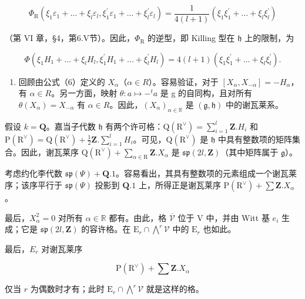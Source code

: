 \[
\varPhi_ {\mathrm{R}} (\xi_ {1} \varepsilon_ {1} + \dots + \xi_ {l} \varepsilon_ {l}, \xi_ {1} ^ {\prime} \varepsilon_ {1} + \dots + \xi_ {l} ^ {\prime} \varepsilon_ {l}) = \frac {1}{4 (l + 1)} (\xi_ {1} \xi_ {1} ^ {\prime} + \dots + \xi_ {l} \xi_ {l} ^ {\prime})
\]

（第 VI 章，§4，第6.V节）。因此，\(\varPhi_{\mathrm{R}}\) 的逆型，即 Killing 型在 \(\mathfrak{h}\) 上的限制，为

\[
\Phi (\xi_ {1} H _ {1} + \dots + \xi_ {l} H _ {l}, \xi_ {1} ^ {\prime} H _ {1} + \dots + \xi_ {l} ^ {\prime} H _ {l}) = 4 (l + 1) (\xi_ {1} \xi_ {1} ^ {\prime} + \dots + \xi_ {l} \xi_ {l} ^ {\prime}).
\]

\begin{enumerate}
\def\labelenumi{(\Roman{enumi})}
\setcounter{enumi}{8}
\tightlist
\item
回顾由公式（6）定义的 \(X_{\alpha}\)（\(\alpha \in R\)）。容易验证，对于 \([X_{\alpha}, X_{-\alpha}] = -H_{\alpha}\)，有 \(\alpha \in R\)。另一方面，映射 \(\theta : a \mapsto -^{t}a\) 是 g 的自同构，且对所有 \(\theta(X_{\alpha}) = X_{-\alpha}\) 有 \(\alpha \in R\)。因此，\((X_{\alpha})_{\alpha \in \mathbb{R}}\) 是 \((\mathfrak{g}, \mathfrak{h})\) 中的谢瓦莱系。
\end{enumerate}

假设 \(k = \mathbf{Q}\)。嘉当子代数 \(\mathfrak{h}\) 有两个许可格：\(\mathrm{Q}(\mathrm{R}^{\vee}) = \sum_{i=1}^{l} \mathbf{Z}.H_i\) 和 \(\mathrm{P}(\mathrm{R}^{\vee}) = \mathrm{Q}(\mathrm{R}^{\vee}) + \frac{1}{2}\mathbf{Z}. \sum_{i=1}^{l} H_i\)。可见，\(\mathrm{Q}(\mathrm{R}^{\vee})\) 是 \(\mathfrak{h}\) 中具有整数项的矩阵集合。因此，谢瓦莱序 \(\mathrm{Q}(\mathrm{R}^{\vee}) + \sum_{\alpha \in \mathrm{R}} \mathbf{Z}.X_{\alpha}\) 是 \(\mathfrak{sp}(2l,\mathbf{Z})\)（其中矩阵属于 \(\mathfrak{g}\)）。

考虑约化李代数 \(\mathfrak{sp}(\varPsi) + \mathbf{Q}.1\)。容易看出，其具有整数项的元素组成一个谢瓦莱序；该序平行于 \(\mathfrak{sp}(\varPsi)\) 投影到 \(\mathbf{Q}.1\) 上，所得正是谢瓦莱序 \(\mathrm{P}(\mathrm{R}^{\vee}) + \sum \mathbf{Z}.X_{\alpha}\)。

最后，\(X_{\alpha}^{2} = 0\) 对所有 \(\alpha \in \mathbb{R}\) 都有。由此，格 \(\overline{\mathcal{V}}\) 位于 \(\mathrm{V}\) 中，并由 Witt 基 \(e_i\) 生成；它是 \(\mathfrak{sp}(2l,\mathbf{Z})\) 的容许格。在 \(\mathrm{E}_r \cap \bigwedge^r \mathcal{V}\) 中的 \(\mathrm{E}_r\) 也如此。

最后，\(E_{r}\) 对谢瓦莱序

\[
\mathrm{P} (\mathrm{R} ^ {\vee}) + \sum \mathbf {Z}. X _ {\alpha}
\]

仅当 \(r\) 为偶数时才有；此时 \(\mathrm{E}_r\cap \bigwedge^r\mathcal{V}\) 就是这样的格。


